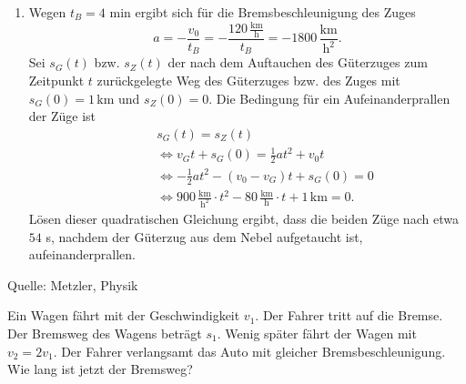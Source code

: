 \begin{MExercises}
\begin{MExercise}
\begin{MSolution}
\begin{enumerate}
      \item Wegen $t_B=4$ min ergibt sich f\"ur die Bremsbeschleunigung des Zuges 
      \begin{equation*}
      a=-\frac{v_0}{t_B}=-\frac{120 \,\frac{\text{km}}{\text{h}}}{t_B}=-1800\,\frac{\text{km}}{\text{h}^2}.
      \end{equation*} Sei $s_G(t)$ bzw. $s_Z(t)$ der nach dem Auftauchen des G\"uterzuges zum Zeitpunkt $t$ zur\"uckgelegte Weg des G\"uterzuges bzw. des Zuges mit $s_G(0)=1\,\text{km}$ und $s_Z(0)=0$. Die Bedingung f\"ur ein Aufeinanderprallen der Z\"uge ist
      \begin{eqnarray*}
      \qquad &s_G(t) =s_Z(t)\\
      &\Leftrightarrow v_G t + s_G(0) =\frac{1}{2} a t^2+v_0 t\\
      &\Leftrightarrow -\frac{1}{2} a t^2-(v_0-v_G)t+s_G(0)=0\\
      &\Leftrightarrow 900 \,\frac{\text{km}}{\text{h}^2}\cdot t^2 -80\,\frac{\text{km}}{\text{h}}\cdot t + 1\,\text{km} =0.
      \end{eqnarray*} L\"osen dieser quadratischen Gleichung ergibt, dass die beiden Z\"uge nach etwa $54$ s, nachdem der G\"uterzug aus dem Nebel aufgetaucht ist, aufeinanderprallen.
      
     \end{enumerate}
     
     \end{MSolution}
     
     Quelle: Metzler, Physik
     \end{MExercise}
     

    

     \begin{MExercise}
     Ein Wagen f\"ahrt mit der Geschwindigkeit $v_1$. Der Fahrer tritt auf die Bremse. Der Bremsweg des Wagens betr\"agt $s_1$. Wenig sp\"ater f\"ahrt der Wagen mit $v_2=2v_1$. Der Fahrer verlangsamt das Auto mit gleicher Bremsbeschleunigung. Wie lang ist jetzt der Bremsweg?
     

\end{MExercise}
\end{MExercises}
